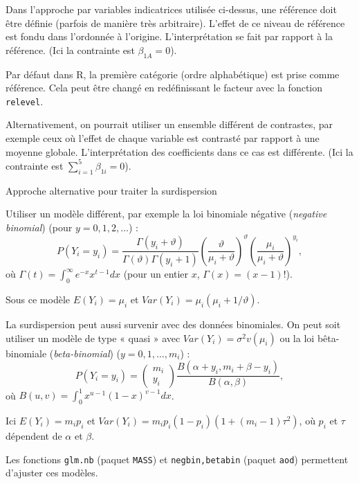 \documentclass{BeamerTemplate}
\begin{document}
\begin{refsection}
\begin{frame}{}
Dans l'approche par variables indicatrices utilisée
ci-dessus, une référence doit être définie (parfois de manière très arbitraire). L'effet de ce niveau de référence est fondu dans
l'ordonnée à l'origine. L'interprétation se fait par rapport à la référence. (Ici la
contrainte est $\beta_{1A}=0$).

Par défaut dans R, la première catégorie (ordre alphabétique) est prise comme
référence. Cela peut être changé en redéfinissant le facteur avec la fonction
\texttt{relevel}.

\bigskip
Alternativement, on pourrait utiliser un ensemble différent de
{\color{blue}contrastes}, par exemple ceux où l'effet de chaque
variable est contrasté par rapport à une moyenne globale. L'interprétation des
coefficients dans ce cas est différente. (Ici la contrainte est
$\sum_{i=1}^5 \beta_{1i}=0$).
\end{frame}

\begin{frame}{Approche alternative pour traiter la surdispersion}

Utiliser un modèle différent,
par exemple la loi {\color{blue}binomiale négative} (\textit{negative binomial}) (pour
$y=0,1,2,\dots$) :
$$P(Y_i=y_i) = \frac {\Gamma(y_i+\vartheta)}{\Gamma(\vartheta)\Gamma(y_i+1)}\left(\frac{\vartheta}{\mu_i+\vartheta}\right)^\vartheta
\left(\frac{\mu_i}{\mu_i+\vartheta}\right)^{y_i},$$ 
où $\Gamma(t)= \int_0^{\infty} e^{-x} x^{t-1}dx$ (pour un entier $x$,
$\Gamma(x) = (x-1)!$).

Sous ce modèle $E(Y_i)= \mu_i$ et $Var(Y_i)= \mu_i(\mu_i+1/\vartheta)$.
\end{frame}

\begin{frame}{}

La surdispersion peut aussi survenir avec des données binomiales. On peut soit utiliser un
modèle de type « quasi » avec $Var(Y_i) = \sigma^2 v(\mu_i)$ ou la
loi {\color{blue}bêta-binomiale} (\textit{beta-binomial}) ($y=0, 1, \ldots, m_i$) :
$$P(Y_i=y_i) = \left(
\begin{array}{cc}
m_i\\
y_i
\end{array} \right) \frac{B(\alpha+y_i,m_i+\beta-y_i)}{B(\alpha,\beta)},$$
où $B(u,v) = \int_0^1 x^{u-1}(1-x)^{v-1}dx$.

\bigskip
Ici $E(Y_i) = m_i p_i$ et $Var(Y_i) = m_i p_i (1-p_i) (1 + (m_i-1) \tau^2)$,
où $p_i$ et $\tau$ dépendent de $\alpha$ et $\beta$.

\bigskip
Les fonctions \texttt{glm.nb} (paquet \texttt{MASS}) et
\texttt{negbin,betabin} (paquet \texttt{aod}) permettent d'ajuster ces modèles.


\end{frame}
\end{refsection}
\end{document}
